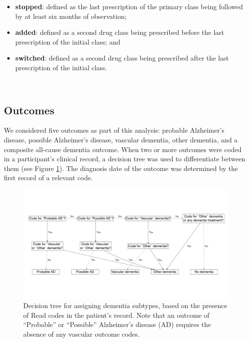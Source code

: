 \documentclass[a4paper, twoside]{templates/ociamthesis}
\providecommand{\tightlist}{%
  \setlength{\itemsep}{0pt}\setlength{\parskip}{0pt}}
\begin{document}
\begin{itemize}
\tightlist
\item
  \textbf{stopped}: defined as the last prescription of the primary class being followed by at least six months of observation;
\item
  \textbf{added}: defined as a second drug class being prescribed before the last prescription of the initial class; and
\item
  \textbf{switched}: defined as a second drug class being prescribed after the last prescription of the initial class.
\end{itemize}

~

\hypertarget{cprd-outcomes}{%
\subsection{Outcomes}\label{cprd-outcomes}}

We considered five outcomes as part of this analysis: probable Alzheimer's disease, possible Alzheimer's disease, vascular dementia, other dementia, and a composite all-cause dementia outcome. When two or more outcomes were coded in a participant's clinical record, a decision tree was used to differentiate between them (see Figure \ref{fig:decisionTreeFig}). The diagnosis date of the outcome was determined by the first record of a relevant code.





\begin{figure}[H]
\includegraphics[width=1\linewidth]{figures/cprd-analysis/decision_tree} \caption[Decision tree for assigning dementia subtypes]{Decision tree for assigning dementia subtypes, based on the presence of Read codes in the patient's record. Note that an outcome of ``Probable'' or ``Possible'' Alzheimer's disease (AD) requires the absence of any vascular outcome codes.}\label{fig:decisionTreeFig}
\end{figure}
\end{document}
